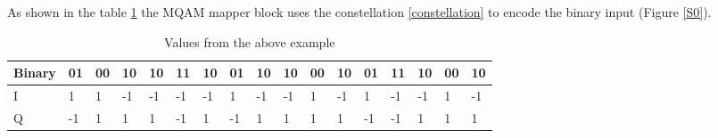As shown in the table \ref{valuesMQAM} the MQAM mapper block uses the constellation \ref{constellation} to encode the binary input (Figure \ref{S0}).

\begin{table}[htb]
\caption{Values from the above example}\label{valuesMQAM}
\centering
\begin{tabular}{|l|l|l|l|l|l|l|l|l|l|l|l|l|l|l|l|l|}
\hline
Binary & 01 & 00 & 10 & 10 & 11 & 10 & 01 & 10 & 10 & 00 & 10 & 01 & 11 & 10 & 00 & 10\\ \hline
I & 1 & 1 & -1 & -1 & -1 & -1 & 1 & -1 & -1 & 1 & -1 & 1 & -1 & -1 & 1 & -1 \\ \hline
Q & -1 & 1 & 1 & 1 & -1 & 1 & -1 & 1 & 1 & 1 & 1 & -1 & -1 & 1 & 1 & 1 \\ \hline
\end{tabular}
\end{table}


